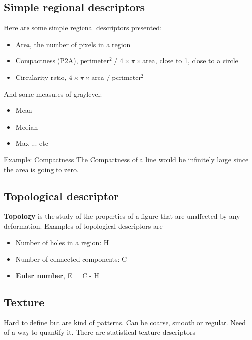 \subsection*{Simple regional descriptors}
Here are some simple regional descriptors presented:

\begin{itemize}
	\item Area, the number of pixels in a region
	\item Compactness (P2A), perimeter$^2$ / $4 \times \pi \times$area, close to 1, close to a circle
	\item Circularity ratio, $4 \times \pi \times$area / perimeter$^2$
\end{itemize}

And some measures of graylevel:
\begin{itemize}
	\item Mean
	\item Median
	\item Max ... etc
\end{itemize}

\begin{example}{Example: Compactness}
The Compactness of a line would be infinitely large since the area is going to zero. 
\end{example}	


\subsection*{Topological  descriptor}
\textbf{Topology} is the study of the properties of a figure that are unaffected by any deformation. Examples of topological descriptors are

\begin{itemize}
 	\item Number of holes in a region: H
 	\item Number of connected components: C
 	\item \textbf{Euler number}, E = C - H
 \end{itemize} 

 \subsection*{Texture}
 Hard to define but are kind of patterns. Can be coarse, smooth or regular. Need of a way to quantify it. There are statistical texture descriptors:

